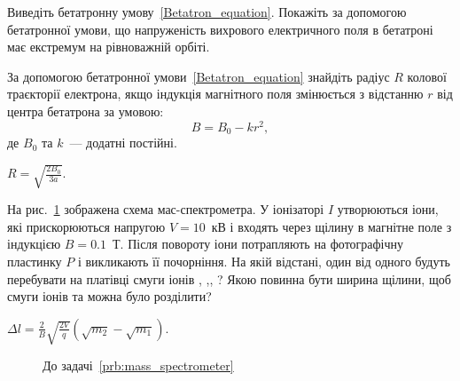 \begin{problem}
   Виведіть бетатронну умову~\ref{Betatron_equation}. Покажіть за допомогою бетатронної умови, що напруженість вихрового електричного поля в бетатроні має екстремум на рівноважній орбіті.
\end{problem}

\begin{problem}
    За допомогою бетатронної умови~\ref{Betatron_equation} знайдіть радіус $R$ колової траєкторії електрона, якщо індукція магнітного поля змінюється з відстанню $r$ від центра бетатрона за умовою:
\[
	B = B_0 - kr^2,
\]
де $B_0$ та $k$~--- додатні постійні.
\begin{solution}
	$R = \sqrt{\frac{2B_0}{3a}}.$
\end{solution}
\end{problem}

\begin{problem}\label{prb:mass_spectrometer}%
На рис.~\ref{mass_spectrometer} зображена схема мас-спектрометра. У іонізаторі $I$ утворюються іони, які прискорюються напругою $V = 10$~кВ і входять через щілину в магнітне поле з індукцією $B = 0.1$~Т. Після повороту іони потрапляють на фотографічну пластинку $P$ і викликають її почорніння. На якій відстані, один від одного будуть перебувати на платівці смуги іонів , ,, ? Якою повинна бути ширина щілини, щоб смуги іонів  та  можна було розділити? 
\begin{solution}
	$\Delta l = \frac{2}{B}\sqrt{\frac{2V}{q}} \left( \sqrt{m_2} - \sqrt{m_1} \right) $.
\end{solution}
\end{problem}
\begin{figure}[h!]\centering
\caption{До задачі~\ref{prb:mass_spectrometer}}
\label{mass_spectrometer}
\end{figure}

